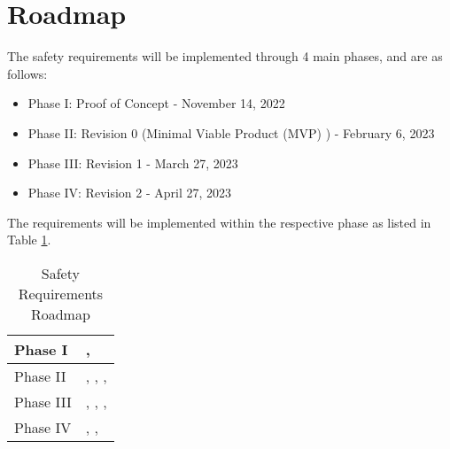 \documentclass{article}
\begin{document}
\clearpage

\section{Roadmap}

The safety requirements will be implemented through 4 main phases, and are as follows:
\begin{itemize}
    \item Phase I: Proof of Concept - November 14, 2022
    \item Phase II: Revision 0 (Minimal Viable Product (MVP) ) - February 6, 2023 
    \item Phase III: Revision 1 - March 27, 2023
    \item Phase IV: Revision 2 - April 27, 2023
\end{itemize}

The requirements will be implemented within the respective phase as listed in Table \ref{SR_Roadmap}.

\begin{table}[!h]
\begin{center}
\caption {Safety Requirements Roadmap}
\label{SR_Roadmap}
\begin{tabular}{ | m{3cm} | m{11cm} | }
\hline
Phase I & \nameref{SR_002}, \nameref{SR_010} \\
\hline
Phase II & \nameref{SR_001}, \nameref{SR_006}, \nameref{SR_007}, \nameref{SR_013} \\
\hline
Phase III & \nameref{SR_003}, \nameref{SR_009}, \nameref{SR_011}, \nameref{SR_012} \\
\hline
Phase IV & \nameref{SR_004}, \nameref{SR_005}, \nameref{SR_008} \\
\hline
\end{tabular}
\end{center}
\end{table}
\end{document}
